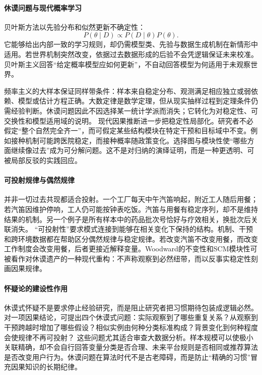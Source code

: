 \paragraph{休谟问题与现代概率学习}

贝叶斯方法以先验分布和似然更新不确定性：
\[
P(\theta\mid D)\propto P(D\mid\theta)P(\theta).
\]
它能够给出内部一致的学习规则，却仍需模型类、先验与数据生成机制在新情形中适用。若世界机制突然改变，依据过去数据形成的后验不会凭逻辑保证未来校准。贝叶斯主义回答“给定概率模型应如何更新”，不自动回答模型为何适用于未观察世界。

频率主义的大样本保证同样带条件：样本来自稳定分布、观测满足相应独立或弱依赖、模型或估计方程正确。大数定律是数学定理，但从现实抽样过程到定理条件仍需经验判断。休谟问题因此不因选择某一统计学派而消失；它转化为对稳定性、可交换性和模型适用域的说明。
现代因果推断进一步把稳定性局部化。研究者不必假定“整个自然完全齐一”，而可假定某些结构模块在特定干预和目标域中不变。例如接种机制可能跨医院稳定，而接种概率随政策变化。选择图与模块性使“哪些方面继续像过去”成为可分解问题。这不是对归纳的演绎证明，而是一种更透明、可被局部反驳的实践回应。

\paragraph{可投射规律与偶然规律}

并非一切过去共现都适合投射。一个工厂每天中午汽笛响起，附近工人随后用餐；若汽笛因维护停响，工人仍可能按钟表吃饭。汽笛与用餐有稳定序列，却不是维持结果的机制。另一个例子是所有样本中的药品批次号恰好与疗效相关，换批次后关联消失。
“可投射性”要求模式连接到能够在相关变化下保持的结构。机制、干预和跨环境数据都在帮助区分偶然规律与稳定规律。若改变汽笛不改变用餐，而改变工作制度会改变用餐，后者更接近解释变量。Woodward的不变性和SCM模块性可被看作对休谟遗产的一种现代重构：不声称观察到必然纽带，而以反事实稳定性刻画因果规律。

\paragraph{怀疑论的建设性作用}

休谟式怀疑不是要求停止经验研究，而是阻止研究者把习惯期待包装成逻辑必然。对一项因果结论，可提出四个休谟式问题：实际观察到了哪些重复关系？从观察到干预跨越时增加了哪些假设？相似实例由何种分类标准构成？背景变化到何种程度会使规律不再可投射？
这些问题尤其适合审查大数据分析。样本规模可以使极小关联精确，却不会自行回答变量分类是否合理、未来平台规则是否相同或推荐算法是否改变用户行为。休谟问题在算法时代不是古老障碍，而是防止“精确的习惯”冒充因果知识的长期纪律。

